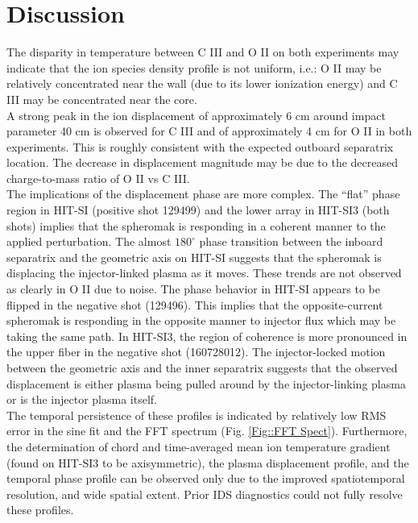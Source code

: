 \section{Discussion}
\hspace{4ex}The disparity in temperature between C III and O II on both experiments may indicate that the ion species density profile is not uniform, i.e.: O II may be relatively concentrated near the wall (due to its lower ionization energy) and C III may be concentrated near the core.  \\
\hspace*{4ex}A strong peak in the ion displacement of approximately 6 cm around impact parameter 40 cm is observed for C III and of approximately 4 cm for O II in both experiments. This is roughly consistent with the expected outboard separatrix location\cite{hossack2015study}. The decrease in displacement magnitude may be due to the decreased charge-to-mass ratio of O II vs C III. \\
\hspace*{4ex}The implications of the displacement phase are more complex. The ``flat'' phase region in HIT-SI (positive shot 129499) and the lower array in HIT-SI3 (both shots) implies that the spheromak is responding in a coherent manner to the applied perturbation. The almost $180^\circ$ phase transition between the inboard separatrix and the geometric axis on HIT-SI suggests that the spheromak is displacing the injector-linked plasma as it moves. These trends are not observed as clearly in O II due to noise. The phase behavior in HIT-SI appears to be flipped in the negative shot (129496). This implies that the opposite-current spheromak is responding in the opposite manner to injector flux which may be taking the same path. In HIT-SI3, the region of coherence is more pronounced in the upper fiber in the negative shot (160728012). The injector-locked motion between the geometric axis and the inner separatrix suggests that the observed displacement is either plasma being pulled around by the injector-linking plasma or is the injector plasma itself.\\
\hspace*{4ex}The temporal persistence of these profiles is indicated by relatively low RMS error in the sine fit and the FFT spectrum (Fig. \ref{Fig::FFT Spect}). Furthermore, the determination of chord and time-averaged mean ion temperature gradient (found on HIT-SI3 to be axisymmetric), the plasma displacement profile, and the temporal phase profile can be observed only due to the improved spatiotemporal resolution, and wide spatial extent. Prior IDS diagnostics could not fully resolve these profiles.

